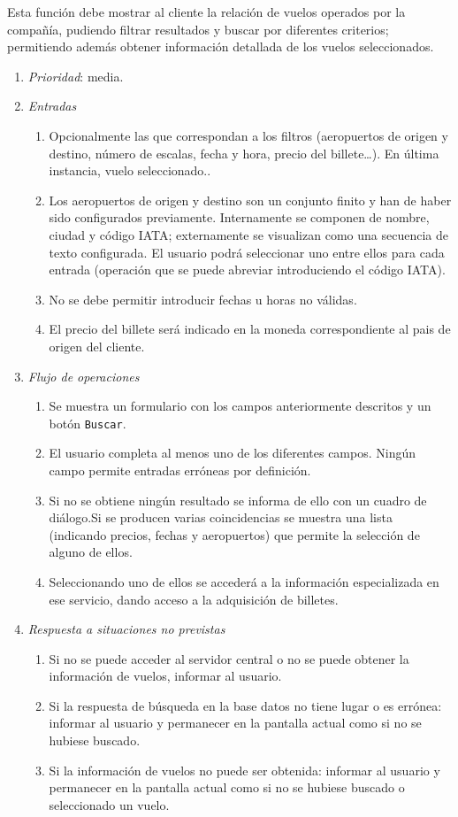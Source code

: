 	Esta función debe mostrar al cliente la relación de vuelos operados por la compañía, pudiendo filtrar resultados y buscar por diferentes criterios; permitiendo además obtener información detallada de los vuelos seleccionados.
	
\begin{enumerate}
	\item \textit{Prioridad}: media.
	\item \textit{Entradas}
	\begin{enumerate}
		\item Opcionalmente las que correspondan a los filtros (aeropuertos de origen y destino, número de escalas, fecha y hora, precio del billete\ldots). En última instancia, vuelo seleccionado..
		\item Los aeropuertos de origen y destino son un conjunto finito y han de haber sido configurados previamente. Internamente se componen de nombre, ciudad y código \gls{IATA}; externamente se visualizan como una secuencia de texto configurada. El usuario podrá seleccionar uno entre ellos para cada entrada (operación que se puede abreviar introduciendo el código IATA).
		\item No se debe permitir introducir fechas u horas no válidas.
		\item El precio del billete será indicado en la moneda correspondiente al pais de origen del cliente.
	\end{enumerate}
	\item \textit{Flujo de operaciones}
	\begin{enumerate}
		\item Se muestra un formulario con los campos anteriormente descritos y un botón \verb|Buscar|.
		\item El usuario completa al menos uno de los diferentes campos. Ningún campo permite entradas erróneas por definición.
		\item Si no se obtiene ningún resultado se informa de ello con un cuadro de diálogo.Si se producen varias coincidencias se muestra una lista (indicando precios, fechas y aeropuertos) que permite la selección de alguno de ellos.
		\item Seleccionando uno de ellos se accederá a la información especializada en ese servicio, dando acceso a la adquisición de billetes.
	\end{enumerate}
	\item \textit{Respuesta a situaciones no previstas}
	\begin{enumerate}
		\item Si no se puede acceder al servidor central o no se puede obtener la información de vuelos, informar al usuario.
		\item Si la respuesta de búsqueda en la base datos no tiene lugar o es errónea: informar al usuario y permanecer en la pantalla actual como si no se hubiese buscado.
		\item Si la información de vuelos no puede ser obtenida: informar al usuario y permanecer en la pantalla actual como si no se hubiese buscado o seleccionado un vuelo.
	\end{enumerate}
\end{enumerate}
